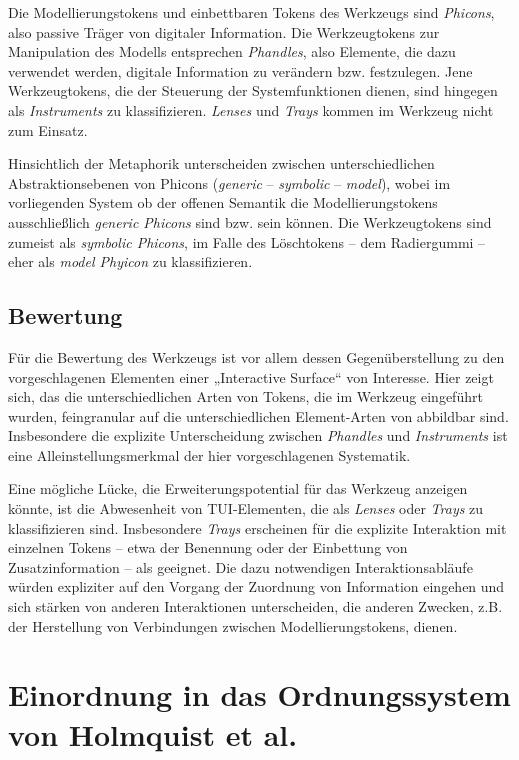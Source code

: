 Die Modellierungstokens und einbettbaren Tokens des Werkzeugs sind \emph{Phicons}, also passive Träger von digitaler Information. Die Werkzeugtokens zur Manipulation des Modells entsprechen \emph{Phandles}, also Elemente, die dazu verwendet werden, digitale Information zu verändern bzw. festzulegen. Jene Werkzeugtokens, die der Steuerung der Systemfunktionen dienen, sind hingegen als \emph{Instruments} zu klassifizieren. \emph{Lenses} und \emph{Trays} kommen im Werkzeug nicht zum Einsatz.

Hinsichtlich der Metaphorik unterscheiden \citet{Ullmer97} zwischen unterschiedlichen Abstraktionsebenen von Phicons (\emph{generic} -- \emph{symbolic} -- \emph{model}), wobei im vorliegenden System ob der offenen Semantik die Modellierungstokens ausschließlich \emph{generic Phicons} sind bzw. sein können. Die Werkzeugtokens sind zumeist als \emph{symbolic Phicons}, im Falle des Löschtokens -- dem Radiergummi -- eher als \emph{model Phyicon} zu klassifizieren.

\subsection{Bewertung} 

Für die Bewertung des Werkzeugs ist vor allem dessen Gegenüberstellung zu den vorgeschlagenen Elementen einer „Interactive Surface“ von Interesse. Hier zeigt sich, das die unterschiedlichen Arten von Tokens, die im Werkzeug eingeführt wurden, feingranular auf die unterschiedlichen Element-Arten von \citep{Ishii97} abbildbar sind. Insbesondere die explizite Unterscheidung zwischen \emph{Phandles} und \emph{Instruments} ist eine Alleinstellungsmerkmal der hier vorgeschlagenen Systematik.

Eine mögliche Lücke, die Erweiterungspotential für das Werkzeug anzeigen könnte, ist die Abwesenheit von TUI-Elementen, die als \emph{Lenses} oder \emph{Trays} zu klassifizieren sind. Insbesondere \emph{Trays} erscheinen für die explizite Interaktion mit einzelnen Tokens -- etwa der Benennung oder der Einbettung von Zusatzinformation -- als geeignet. Die dazu notwendigen Interaktionsabläufe würden expliziter auf den Vorgang der Zuordnung von Information eingehen und sich stärken von anderen Interaktionen unterscheiden, die anderen Zwecken, z.B. der Herstellung von Verbindungen zwischen Modellierungstokens, dienen.


\section{Einordnung in das Ordnungssystem von Holmquist et al.} %
\label{sec:einordnung_in_das_ordnungssystem_von_holmquist_et_al_}

